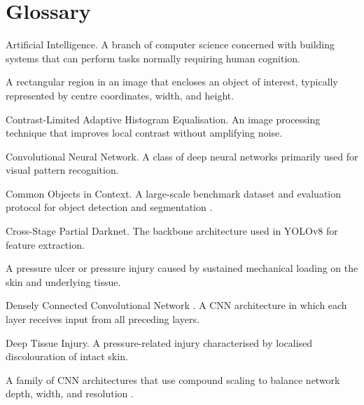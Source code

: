 \documentclass[a4paper,12pt,twoside]{report}
\begin{document}
\chapter*{Glossary}

\begin{description}[leftmargin=4cm, style=nextline]

\item[AI] Artificial Intelligence. A branch of computer science concerned with
  building systems that can perform tasks normally requiring human cognition.

\item[Bounding Box] A rectangular region in an image that encloses an object of
  interest, typically represented by centre coordinates, width, and height.

\item[CLAHE] Contrast-Limited Adaptive Histogram Equalisation. An image
  processing technique that improves local contrast without amplifying noise.

\item[CNN] Convolutional Neural Network. A class of deep neural networks
  primarily used for visual pattern recognition.

\item[COCO] Common Objects in Context. A large-scale benchmark dataset and
  evaluation protocol for object detection and segmentation \citep{lin2014coco}.

\item[CSPDarknet] Cross-Stage Partial Darknet. The backbone architecture used
  in YOLOv8 for feature extraction.

\item[Decubitus] A pressure ulcer or pressure injury caused by sustained
  mechanical loading on the skin and underlying tissue.

\item[DenseNet] Densely Connected Convolutional Network \citep{huang2017densely}.
  A CNN architecture in which each layer receives input from all preceding layers.

\item[DTI] Deep Tissue Injury. A pressure-related injury characterised by
  localised discolouration of intact skin.

\item[EfficientNet] A family of CNN architectures that use compound scaling to
  balance network depth, width, and resolution \citep{tan2019efficientnet}.


\end{description}
\end{document}
